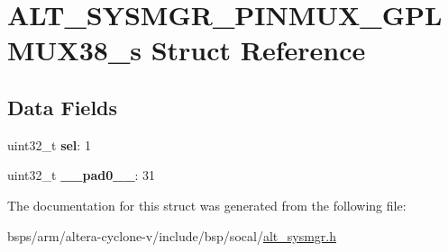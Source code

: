 \hypertarget{structALT__SYSMGR__PINMUX__GPLMUX38__s}{}\section{A\+L\+T\+\_\+\+S\+Y\+S\+M\+G\+R\+\_\+\+P\+I\+N\+M\+U\+X\+\_\+\+G\+P\+L\+M\+U\+X38\+\_\+s Struct Reference}
\label{structALT__SYSMGR__PINMUX__GPLMUX38__s}
\subsection*{Data Fields}
\begin{DoxyCompactItemize}
\item 
\mbox{\label{structALT__SYSMGR__PINMUX__GPLMUX38__s_aed3701c1bb980071ccce0dc7a666df0b}} 
uint32\+\_\+t {\bfseries sel}\+: 1
\item 
\mbox{\label{structALT__SYSMGR__PINMUX__GPLMUX38__s_a51b2ce0576a95f236169ad6d37307726}} 
uint32\+\_\+t {\bfseries \+\_\+\+\_\+pad0\+\_\+\+\_\+}\+: 31
\end{DoxyCompactItemize}


The documentation for this struct was generated from the following file\+:\begin{DoxyCompactItemize}
\item 
bsps/arm/altera-\/cyclone-\/v/include/bsp/socal/\mbox{\hyperlink{alt__sysmgr_8h}{alt\+\_\+sysmgr.\+h}}\end{DoxyCompactItemize}
